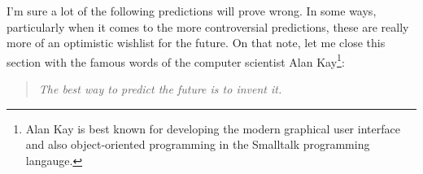 I'm sure a lot of the following predictions will prove wrong. In some ways,
particularly when it comes to the more controversial predictions, these are
really more of an optimistic wishlist for the future. On that note, let me
close this section with the famous words of the computer scientist Alan
Kay\footnote{Alan Kay is best known for developing the modern graphical user
interface and also object-oriented programming in the Smalltalk programming
langauge.}:
\begin{quote}
    \emph{The best way to predict the future is to invent it.}
\end{quote}

